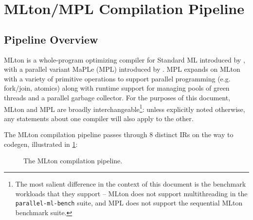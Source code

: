 
\section{MLton/MPL Compilation Pipeline}

\subsection{Pipeline Overview}
MLton is a whole-program optimizing compiler for Standard ML introduced by
\citet{mlton-proj}, with a parallel variant MaPLe (MPL) introduced by
\citet{mpl-orig}. MPL expands on MLton with a variety of primitive operations to
support parallel programming (e.g. fork/join, atomics) along with runtime
support for managing pools of green threads and a parallel garbage collector.
For the purposes of this document, MLton and MPL are broadly
interchangeable\footnote{ The most salient difference in the context of this
document is the benchmark workloads that they support -- MLton does not support
multithreading in the \texttt{parallel-ml-bench} suite, and MPL does not support
the sequential MLton benchmark suite.}: unless explicitly noted otherwise, any
statements about one compiler will also apply to the other.

The MLton compilation pipeline passes through 8 distinct IRs
\citep{mlton-website} on the way to codegen, illustrated in
\cref{fig:mlton-ir-pipeline}:


\begin{figure}[htbp]
  \centering
  \caption{The MLton compilation pipeline.}
  \label{fig:mlton-ir-pipeline}
\end{figure}

